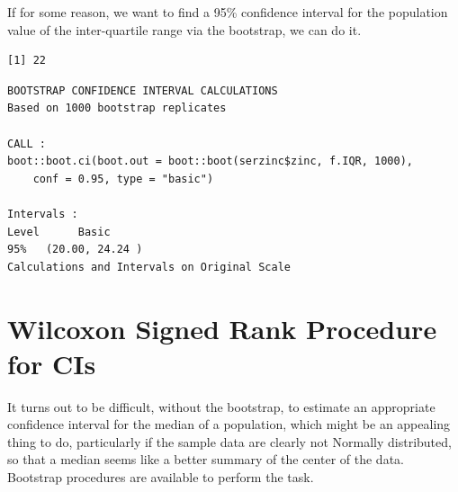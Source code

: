 \documentclass[
]{book}
\newenvironment{Shaded}{\begin{snugshade}}{\end{snugshade}}
\newcommand{\ControlFlowTok}[1]{\textcolor[rgb]{0.13,0.29,0.53}{\textbf{#1}}}
\newcommand{\DataTypeTok}[1]{\textcolor[rgb]{0.13,0.29,0.53}{#1}}
\newcommand{\DecValTok}[1]{\textcolor[rgb]{0.00,0.00,0.81}{#1}}
\newcommand{\FloatTok}[1]{\textcolor[rgb]{0.00,0.00,0.81}{#1}}
\newcommand{\KeywordTok}[1]{\textcolor[rgb]{0.13,0.29,0.53}{\textbf{#1}}}
\newcommand{\NormalTok}[1]{#1}
\newcommand{\OperatorTok}[1]{\textcolor[rgb]{0.81,0.36,0.00}{\textbf{#1}}}
\newcommand{\StringTok}[1]{\textcolor[rgb]{0.31,0.60,0.02}{#1}}
\begin{document}
If for some reason, we want to find a 95\% confidence interval for the population value of the inter-quartile range via the bootstrap, we can do it.

\begin{Shaded}
\end{Shaded}

\begin{verbatim}
[1] 22
\end{verbatim}

\begin{Shaded}
\end{Shaded}

\begin{verbatim}
BOOTSTRAP CONFIDENCE INTERVAL CALCULATIONS
Based on 1000 bootstrap replicates

CALL : 
boot::boot.ci(boot.out = boot::boot(serzinc$zinc, f.IQR, 1000), 
    conf = 0.95, type = "basic")

Intervals : 
Level      Basic         
95%   (20.00, 24.24 )  
Calculations and Intervals on Original Scale
\end{verbatim}

\hypertarget{wilcoxon-signed-rank-procedure-for-cis}{%
\section{Wilcoxon Signed Rank Procedure for CIs}\label{wilcoxon-signed-rank-procedure-for-cis}}

It turns out to be difficult, without the bootstrap, to estimate an appropriate confidence interval for the median of a population, which might be an appealing thing to do, particularly if the sample data are clearly not Normally distributed, so that a median seems like a better summary of the center of the data. Bootstrap procedures are available to perform the task.
\end{document}
